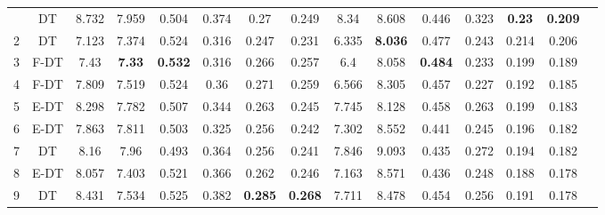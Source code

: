\begin{longtable}{@{\hskip3pt}c@{\hskip3pt}c@{\hskip3pt}c@{\hskip3pt}c@{\hskip3pt}c@{\hskip3pt}c@{\hskip3pt}c@{\hskip3pt}c@{\hskip3pt}c@{\hskip3pt}c@{\hskip3pt}c@{\hskip3pt}c@{\hskip3pt}c@{\hskip3pt}c@{\hskip3pt}c}
\bottomrule
\endlastfoot
          1\label{tab:all-results-final} &             DT &             8.732 &          7.959 &           0.504 &           0.374 &            0.27 &           0.249 &                8.34 &           8.608 &           0.446 &         0.323 &  \textbf{0.23} &  \textbf{0.209} \\
          2 &             DT &             7.123 &          7.374 &           0.524 &           0.316 &           0.247 &           0.231 &               6.335 &  \textbf{8.036} &           0.477 &         0.243 &          0.214 &           0.206 \\
          3 &           F-DT &              7.43 &  \textbf{7.33} &  \textbf{0.532} &           0.316 &           0.266 &           0.257 &                 6.4 &           8.058 &  \textbf{0.484} &         0.233 &          0.199 &           0.189 \\
          4 &           F-DT &             7.809 &          7.519 &           0.524 &            0.36 &           0.271 &           0.259 &               6.566 &           8.305 &           0.457 &         0.227 &          0.192 &           0.185 \\
          5 &           E-DT &             8.298 &          7.782 &           0.507 &           0.344 &           0.263 &           0.245 &               7.745 &           8.128 &           0.458 &         0.263 &          0.199 &           0.183 \\
          6 &           E-DT &             7.863 &          7.811 &           0.503 &           0.325 &           0.256 &           0.242 &               7.302 &           8.552 &           0.441 &         0.245 &          0.196 &           0.182 \\
          7 &             DT &              8.16 &           7.96 &           0.493 &           0.364 &           0.256 &           0.241 &               7.846 &           9.093 &           0.435 &         0.272 &          0.194 &           0.182 \\
          8 &           E-DT &             8.057 &          7.403 &           0.521 &           0.366 &           0.262 &           0.246 &               7.163 &           8.571 &           0.436 &         0.248 &          0.188 &           0.178 \\
          9 &             DT &             8.431 &          7.534 &           0.525 &           0.382 &  \textbf{0.285} &  \textbf{0.268} &               7.711 &           8.478 &           0.454 &         0.256 &          0.191 &           0.178 \\

\end{longtable}
